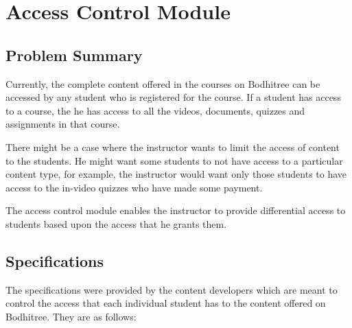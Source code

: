 \section{Access Control Module}

\subsection{Problem Summary}

\hspace{0.35cm} Currently, the complete content offered in the courses on Bodhitree can be accessed by any student who is registered for the course. If a student has access to a course, the he has access to all the videos, documents, quizzes and assignments in that course.
\par There might be a case where the instructor wants to limit the access of content to the students. He might want some students to not have access to a particular content type, for example, the instructor would want only those students to have access to the in-video quizzes who have made some payment.
\par The access control module enables the instructor to provide differential access to students based upon the access that he grants them.

\subsection{Specifications}

The specifications were provided by the content developers which are meant to control the access that each individual student has to the content offered on Bodhitree. They are as follows:

